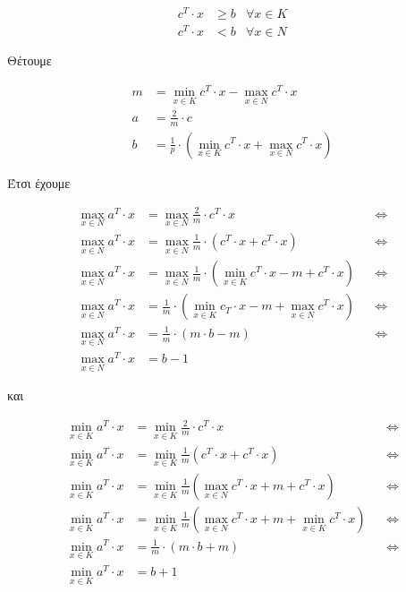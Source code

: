 \documentclass[12pt]{article}
\begin{document}
\begin{align*}
    c^{T} \cdot x & \geq b & \forall x \in K \\
    c^{T} \cdot x & < b & \forall x \in Ν
\end{align*}

\pagebreak

Θέτουμε

\begin{align*}
    m & = \min_{x \in K} c^{T} \cdot x - \max_{x \in N} c^{T} \cdot x \\
    a & = \frac{2}{m} \cdot c \\
    b & = \frac{1}{p} \cdot \left( \min_{x \in K} c^{T} \cdot x + \max_{x \in N} c^{T} \cdot x \right)
\end{align*}

Έτσι έχουμε

\begin{align*}
\max_{x \in N} a^{T} \cdot x & = \max_{x \in N} \frac{2}{m} \cdot c^{T} \cdot x  && \Leftrightarrow \\
\max_{x \in N} a^{T} \cdot x & = \max_{x \in N} \frac{1}{m} \cdot \left( c^{T} \cdot x + c^{T} \cdot x \right) && \Leftrightarrow \\
\max_{x \in N} a^{T} \cdot x & = \max_{x \in N} \frac{1}{m} \cdot \left( \min_{x \in K} c^{T} \cdot x - m + c^{T} \cdot x \right)  && \Leftrightarrow \\
\max_{x \in N} a^{T} \cdot x & = \frac{1}{m} \cdot \left( \min_{x \in K} c_{T} \cdot x - m + \max_{x \in N} c^{T} \cdot x \right)  && \Leftrightarrow \\
\max_{x \in N} a^{T} \cdot x & = \frac{1}{m} \cdot \left( m \cdot b - m \right) && \Leftrightarrow \\
\max_{x \in N} a^{T} \cdot x & = b - 1
\end{align*}

και

\begin{align*}
\min_{x \in K} a^{T} \cdot x & = \min_{x \in K} \frac{2}{m} \cdot c^{T} \cdot x && \Leftrightarrow \\
\min_{x \in K} a^{T} \cdot x & = \min_{x \in K} \frac{1}{m} \left( c^{T} \cdot x + c^{T} \cdot x \right) && \Leftrightarrow \\
\min_{x \in K} a^{T} \cdot x & = \min_{x \in K} \frac{1}{m} \left( \max_{x \in N} c^{T} \cdot x + m + c^{T} \cdot x \right) && \Leftrightarrow \\
\min_{x \in K} a^{T} \cdot x & = \min_{x \in K} \frac{1}{m} \left( \max_{x \in N} c^{T} \cdot x + m + \min_{x \in K} c^{T} \cdot x \right) && \Leftrightarrow \\
\min_{x \in K} a^{T} \cdot x & = \frac{1}{m} \cdot \left( m \cdot b + m \right) && \Leftrightarrow \\
\min_{x \in K} a^{T} \cdot x & = b + 1
\end{align*} \\
\end{document}
